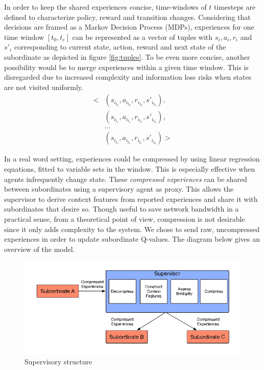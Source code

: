 \documentclass[letterpaper]{article}
\begin{document}
In order to keep the shared experiences concise, time-windows of $t$ timesteps are defined to characterize policy, reward and transition changes. Considering that decisions are framed as a Markov Decision Process (MDPs), experiences for one time window $[t_{0}, t_{e}]$ can be represented as a vector of tuples with $s_i, a_i, r_i$ and $s'_i$ corresponding to current state, action, reward and next state of the subordinate as depicted in figure \ref{fig:tuples}. To be even more concise, another possibility would be to merge experiences within a given time window. This is disregarded due to increased complexity and information loss risks when states are not visited uniformly.
\vspace{\baselineskip}
\begin{align*}
 \biggl<
  & (s_{i_{t_0}},a_{i_{t_0}},r_{i_{t_0}},s'_{i_{t_0}}), \\
  & (s_{i_{t_1}},a_{i_{t_1}},r_{i_{t_1}},s'_{i_{t_0}}), \\
  & \hdots                                              \\
  & (s_{i_{t_e}},a_{i_{t_e}},r_{i_{t_e}},s'_{i_{t_0}})
 \biggr>
\end{align*}
\begingroup\vspace*{-\baselineskip}
 \label{fig:tuples}
\vspace*{\baselineskip}\endgroup

In a real word setting, experiences could be compressed by using linear regression equations, fitted to variable sets in the window. This is especially effective when agents infrequently change state. These \textit{compressed experiences} can be shared between subordinates using a supervisory agent as proxy. This allows the supervisor to derive context features from reported experiences and share it with subordinates that desire so. Though useful to save network bandwidth in a practical sense, from a theoretical point of view, compression is not desirable since it only adds complexity to the system. We chose to send raw, uncompressed experiences in order to update subordinate Q-values. The diagram below gives an overview of the model.
\begin{figure}[ht]
 \begin{center}
  \includegraphics[width=\linewidth]{figures/diagram}
  \caption{Supervisory structure \citep{garant2015accelerating}}
  \label{fig:diagram}
 \end{center}
\end{figure}
\end{document}
